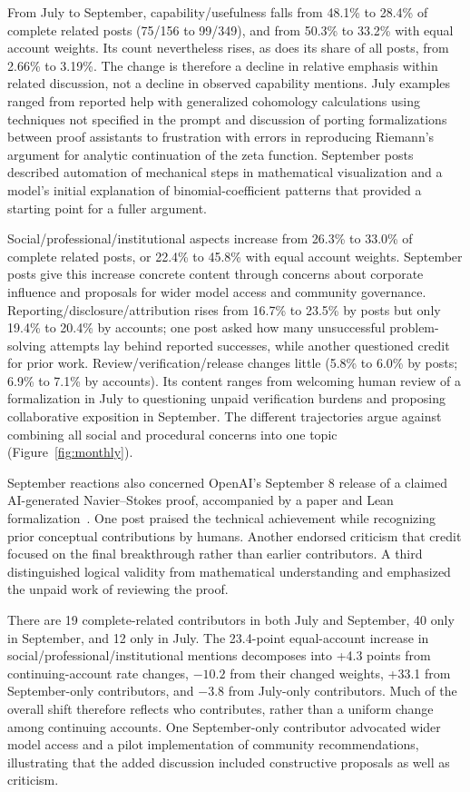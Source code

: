 \documentclass[sigconf,balance=false]{acmart}
\begin{document}
From July to September, capability/usefulness falls from 48.1\% to 28.4\% of complete related posts (75/156 to 99/349), and from 50.3\% to 33.2\% with equal account weights. Its count nevertheless rises, as does its share of all posts, from 2.66\% to 3.19\%. The change is therefore a decline in relative emphasis within related discussion, not a decline in observed capability mentions. July examples ranged from reported help with generalized cohomology calculations using techniques not specified in the prompt and discussion of porting formalizations between proof assistants to frustration with errors in reproducing Riemann's argument for analytic continuation of the zeta function. September posts described automation of mechanical steps in mathematical visualization and a model's initial explanation of binomial-coefficient patterns that provided a starting point for a fuller argument.

Social/professional/institutional aspects increase from 26.3\% to 33.0\% of complete related posts, or 22.4\% to 45.8\% with equal account weights. September posts give this increase concrete content through concerns about corporate influence and proposals for wider model access and community governance. Reporting/disclosure/attribution rises from 16.7\% to 23.5\% by posts but only 19.4\% to 20.4\% by accounts; one post asked how many unsuccessful problem-solving attempts lay behind reported successes, while another questioned credit for prior work. Review/verification/release changes little (5.8\% to 6.0\% by posts; 6.9\% to 7.1\% by accounts). Its content ranges from welcoming human review of a formalization in July to questioning unpaid verification burdens and proposing collaborative exposition in September. The different trajectories argue against combining all social and procedural concerns into one topic (Figure~\ref{fig:monthly}).

September reactions also concerned OpenAI's September 8 release of a claimed AI-generated Navier--Stokes proof, accompanied by a paper and Lean formalization~\cite{openai2026navierstokes}. One post praised the technical achievement while recognizing prior conceptual contributions by humans. Another endorsed criticism that credit focused on the final breakthrough rather than earlier contributors. A third distinguished logical validity from mathematical understanding and emphasized the unpaid work of reviewing the proof.

There are 19 complete-related contributors in both July and September, 40 only in September, and 12 only in July. The 23.4-point equal-account increase in social/professional/institutional mentions decomposes into +4.3 points from continuing-account rate changes, $-10.2$ from their changed weights, +33.1 from September-only contributors, and $-3.8$ from July-only contributors. Much of the overall shift therefore reflects who contributes, rather than a uniform change among continuing accounts. One September-only contributor advocated wider model access and a pilot implementation of community recommendations, illustrating that the added discussion included constructive proposals as well as criticism.
\end{document}
